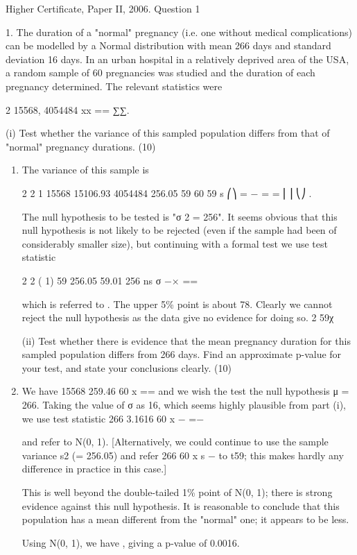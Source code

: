 \documentclass[a4paper,12pt]{article}
\begin{document}
Higher Certificate, Paper II, 2006.  Question 1 
\begin{framed}

1. The duration of a "normal" pregnancy (i.e. one without medical complications) can be modelled by a Normal distribution with mean 266 days and standard deviation 16 days.  In an urban hospital in a relatively deprived area of the USA, a random sample of 60 pregnancies was studied and the duration of each pregnancy determined.  The relevant statistics were 
 
2 15568, 4054484 xx == ∑∑. 
 
(i) Test whether the variance of this sampled population differs from that of "normal" pregnancy durations. (10) 
 

\end{framed}



 \begin{enumerate}
\item The variance of this sample is 
 
2 2 1 15568 15106.93 4054484 256.05 59 60 59
s
⎛⎞ = − = = ⎜⎟ ⎝⎠ . 
 
The null hypothesis to be tested is "σ 2 = 256".  It seems obvious that this null hypothesis is not likely to be rejected (even if the sample had been of considerably smaller size), but continuing with a formal test we use test statistic 
 
2
2 ( 1) 59 256.05 59.01 256 ns σ −× ==
 
 
which is referred to .  The upper 5\% point is about 78.  Clearly we cannot reject the null hypothesis as the data give no evidence for doing so. 2 59χ
 
 
\begin{framed}
(ii) Test whether there is evidence that the mean pregnancy duration for this sampled population differs from 266 days.  Find an approximate p-value for your test, and state your conclusions clearly. (10) 
\end{framed} 
\item We have  15568 259.46 60 x ==  and we wish the test the null hypothesis μ = 266.  Taking the value of σ as 16, which seems highly plausible from part (i), we use test statistic 
 266 3.1616 60 x − =− 
 
and refer to N(0, 1). 
 [Alternatively, we could continue to use the sample variance s2 (= 256.05) and refer 266 60 x s − to t59;  this makes hardly any difference in practice in this case.] 
 
This is well beyond the double-tailed 1\% point of N(0, 1);  there is strong evidence against this null hypothesis.  It is reasonable to conclude that this population has a mean different from the "normal" one;  it appears to be less. 
 
Using N(0, 1), we have , giving a p-value of 0.0016. 
\end{enumerate}
\end{document}
